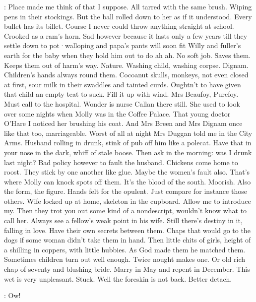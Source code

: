 \Bloom:
Place made me think of that
I suppose.
All tarred with the same brush.
Wiping pens in their stockings.
But the ball rolled down to her
as if it understood.
Every bullet has its billet.
Course
I never could throw anything straight
at school.
Crooked as a ram's horn.
Sad however
because it lasts only a few years
till they settle down to pot·walloping
and papa's pants will soon fit Willy
and fuller's earth for the baby
when they hold him out to do
ah ah.
No soft job.
Saves them.
Keeps them out of harm's way.
Nature.
Washing child,
washing corpse.
Dignam.
Children's hands always round them.
Cocoanut skulls,
monkeys,
not even closed at first,
sour milk in their swaddles and tainted curds.
Oughtn't to have given that child
an empty teat to suck.
Fill it up with wind.
Mrs Beaufoy,
Purefoy.
Must call to the hospital.
Wonder
is nurse Callan there still.
She used to look over some nights
when Molly was in the Coffee Palace.
That young doctor O'Hare
I noticed her brushing his coat.
And Mrs Breen
and Mrs Dignam once like that too,
marriageable.
Worst of all at night
Mrs Duggan told me in the City Arms.
Husband rolling in drunk,
stink of pub off him
like a polecat.
Have that in your nose in the dark,
whiff of stale boose.
Then
ask in the morning:
was I drunk last night?
Bad policy however
to fault the husband.
Chickens come home to roost.
They stick by one another like glue.
Maybe the women's fault also.
That's where Molly can knock spots off them.
It's the blood of the south.
Moorish.
Also the form,
the figure.
Hands felt for the opulent.
Just compare
for instance
those others.
Wife locked up at home,
skeleton in the cupboard.
Allow me to introduce my.
Then they trot you out
some kind of a nondescript,
wouldn't know what to call her.
Always see a fellow's weak point
in his wife.
Still there's destiny in it,
falling in love.
Have their own secrets between them.
Chaps that would go to the dogs
if some woman didn't take them in hand.
Then little chits of girls,
height of a shilling in coppers,
with little hubbies.
As God made them
he matched them.
Sometimes children turn out well enough.
Twice nought makes one.
Or old rich chap of seventy
and blushing bride.
Marry in May
and repent in December.
This wet is very unpleasant.
Stuck.
Well
the foreskin is not back.
Better detach.%

\Bloom:
Ow!


